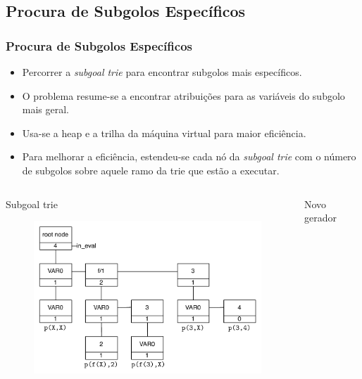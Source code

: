 \documentclass{beamer}
\begin{document}
\subsection{Procura de Subgolos Específicos}
\begin{frame}
   \frametitle{Procura de Subgolos Específicos}
   \begin{itemize}
      \item Percorrer a \emph{subgoal trie} para encontrar subgolos mais específicos.
      \pause
      \item O problema resume-se a encontrar atribuições para as variáveis do subgolo mais geral.
      \item Usa-se a heap e a trilha da máquina virtual para maior eficiência.
      \pause
      \item Para melhorar a eficiência, estendeu-se cada nó da \emph{subgoal trie} com o número de
      subgolos sobre aquele ramo da trie que estão a executar.
   \end{itemize}
   \begin{columns}[t]
        \begin{block}{Subgoal trie}
          \begin{figure}[ht]
            \centering
              \includegraphics[scale=0.31]{in_eval_trie.pdf}
          \end{figure}
        \end{block}
         \begin{block}{Novo gerador}
           \begin{figure}[ht]
             \centering

\end{figure}
\end{block}
\end{columns}
\end{frame}
\end{document}
